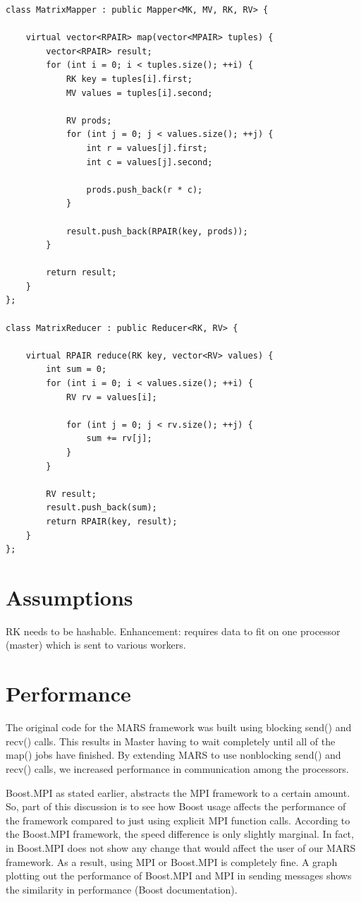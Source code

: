 \documentclass[11pt]{article}
\begin{document}
\begin{verbatim}
class MatrixMapper : public Mapper<MK, MV, RK, RV> {

    virtual vector<RPAIR> map(vector<MPAIR> tuples) {
        vector<RPAIR> result;
        for (int i = 0; i < tuples.size(); ++i) {
            RK key = tuples[i].first;
            MV values = tuples[i].second;

            RV prods;
            for (int j = 0; j < values.size(); ++j) {
                int r = values[j].first;
                int c = values[j].second;

                prods.push_back(r * c);
            }

            result.push_back(RPAIR(key, prods));
        }

        return result;
    }
};

class MatrixReducer : public Reducer<RK, RV> {

    virtual RPAIR reduce(RK key, vector<RV> values) {
        int sum = 0;
        for (int i = 0; i < values.size(); ++i) {
            RV rv = values[i];

            for (int j = 0; j < rv.size(); ++j) {
                sum += rv[j];                
            }
        }

        RV result;
        result.push_back(sum);
        return RPAIR(key, result);
    }
};
\end{verbatim}
\section{Assumptions}
RK needs to be hashable. Enhancement: requires data to fit on one processor (master) which is sent to various  workers.

\section{Performance}
The original code for the MARS framework was built using blocking send() and recv() calls. This results in Master having to wait completely until all of the map() jobs have finished. By extending MARS to use nonblocking send() and recv() calls, we increased performance in communication among the processors.

Boost.MPI as stated earlier, abstracts the MPI framework to a certain amount. So, part of this discussion is to see how Boost usage affects the performance of the framework compared to just using explicit MPI function calls. According to the Boost.MPI framework, the speed difference is only slightly marginal. In fact, in Boost.MPI does not show any change that would affect the user of our MARS framework. As a result, using MPI or Boost.MPI is completely fine. A graph plotting out the performance of Boost.MPI and MPI in sending messages shows the similarity in performance (Boost documentation).
\end{document}
